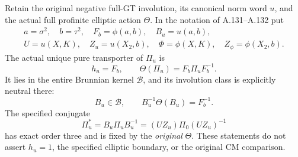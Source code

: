 Retain the original negative full-GT involution, its canonical norm
word \(u\), and the actual full profinite elliptic action \(\Theta\).
In the notation of A.131--A.132 put
\[
\begin{gathered}
 a=\sigma^2,\quad b=\tau^2,\quad F_b=\phi(a,b),\quad
 B_u=u(a,b),\\
 U=u(X,K),\quad Z_u=u(X_2,b),\quad
 \Phi=\phi(X,K),\quad Z_\phi=\phi(X_2,b).
\end{gathered}
\]
The actual unique pure transporter of \(\Pi_u\) is
\[
 h_u=F_b,\qquad \Theta(\Pi_u)=F_b\Pi_uF_b^{-1}.
 \tag{A.133.1}
\]
It lies in the entire Brunnian kernel \(\mathcal B\), and its
involution class is explicitly neutral there:
\[
 B_u\in\mathcal B,\qquad
 B_u^{-1}\Theta(B_u)=F_b^{-1}.
 \tag{A.133.2}
\]
The specified conjugate
\[
 \Pi_u^*=B_u\Pi_uB_u^{-1}
        =(UZ_u)\Pi_0(UZ_u)^{-1}
 \tag{A.133.3}
\]
has exact order three and is fixed by the \emph{original}
\(\Theta\). These statements do not assert \(h_u=1\),
the specified elliptic boundary, or the original CM comparison.

